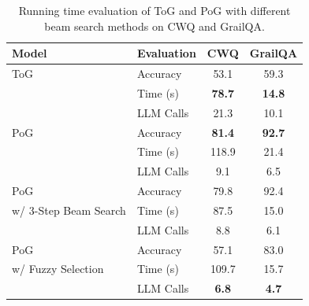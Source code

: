 \begin{table}[h]
\caption{Running time evaluation of ToG and PoG with different beam search methods on CWQ and GrailQA.}\label{fig:running_cost_analysis}
\begin{tabular}{@{}llcc@{}}
\toprule
\textbf{Model}              & \textbf{Evaluation} & \textbf{CWQ}  & \textbf{GrailQA} \\ 
\midrule
ToG    & Accuracy           & 53.1    & 59.3            \\
                          & Time (s)         & \textbf{78.7}       & \textbf{14.8}         \\
                          & LLM Calls       & 21.3           & 10.1               \\ 
\midrule
PoG              & Accuracy              & \textbf{81.4} & \textbf{92.7}   \\
 & Time (s)         &118.9           & 21.4         \\
                          & LLM Calls   & 9.1           & 6.5             \\
\midrule
PoG              & Accuracy           & 79.8          & 92.4     \\
w/ 3-Step Beam Search  & Time (s)         & 87.5       & 15.0         \\
                          & LLM Calls       & 8.8         & 6.1       \\ 
\midrule
PoG      & Accuracy           & 57.1          & 83.0           \\
w/ Fuzzy Selection                          & Time (s)         & 109.7             & 15.7         \\
                          & LLM Calls       & \textbf{6.8}           & \textbf{4.7}             \\  \bottomrule
\end{tabular}
\end{table}



\newpage
